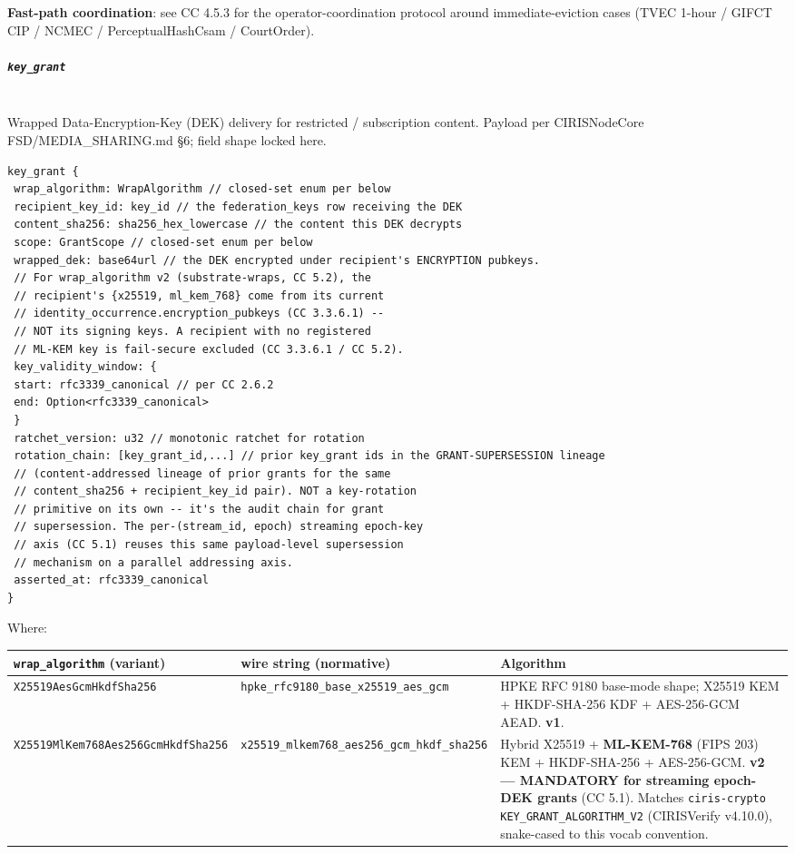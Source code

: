 \documentclass[11pt]{article}
\begin{document}
\textbf{Fast-path coordination}: see CC 4.5.3 for the operator-coordination protocol around immediate-eviction cases (TVEC 1-hour / GIFCT CIP / NCMEC / PerceptualHashCsam / CourtOrder).


\subparagraph{\texttt{key\_grant}}\mbox{}\\


Wrapped Data-Encryption-Key (DEK) delivery for restricted / subscription content. Payload per CIRISNodeCore FSD/MEDIA\_SHARING.md §6; field shape locked here.


\begin{lstlisting}
key_grant {
 wrap_algorithm: WrapAlgorithm // closed-set enum per below
 recipient_key_id: key_id // the federation_keys row receiving the DEK
 content_sha256: sha256_hex_lowercase // the content this DEK decrypts
 scope: GrantScope // closed-set enum per below
 wrapped_dek: base64url // the DEK encrypted under recipient's ENCRYPTION pubkeys.
 // For wrap_algorithm v2 (substrate-wraps, CC 5.2), the
 // recipient's {x25519, ml_kem_768} come from its current
 // identity_occurrence.encryption_pubkeys (CC 3.3.6.1) --
 // NOT its signing keys. A recipient with no registered
 // ML-KEM key is fail-secure excluded (CC 3.3.6.1 / CC 5.2).
 key_validity_window: {
 start: rfc3339_canonical // per CC 2.6.2
 end: Option<rfc3339_canonical>
 }
 ratchet_version: u32 // monotonic ratchet for rotation
 rotation_chain: [key_grant_id,...] // prior key_grant ids in the GRANT-SUPERSESSION lineage
 // (content-addressed lineage of prior grants for the same
 // content_sha256 + recipient_key_id pair). NOT a key-rotation
 // primitive on its own -- it's the audit chain for grant
 // supersession. The per-(stream_id, epoch) streaming epoch-key
 // axis (CC 5.1) reuses this same payload-level supersession
 // mechanism on a parallel addressing axis.
 asserted_at: rfc3339_canonical
}
\end{lstlisting}

Where:


{\footnotesize
\begin{longtable}{|p{5.33cm}|p{5.33cm}|p{5.33cm}|}\hline
\textbf{\texttt{wrap\_algorithm} (variant)} & \textbf{wire string (normative)} & \textbf{Algorithm} \\ \hline\endhead
\texttt{X25519AesGcmHkdfSha256} & \texttt{hpke\_rfc9180\_base\_x25519\_aes\_gcm} & HPKE RFC 9180 base-mode shape; X25519 KEM + HKDF-SHA-256 KDF + AES-256-GCM AEAD. \textbf{v1}. \\ \hline
\texttt{X25519MlKem768Aes256GcmHkdfSha256} & \texttt{x25519\_mlkem768\_aes256\_gcm\_hkdf\_sha256} & Hybrid X25519 + \textbf{ML-KEM-768} (FIPS 203) KEM + HKDF-SHA-256 + AES-256-GCM. \textbf{v2 — MANDATORY for streaming epoch-DEK grants} (CC 5.1). Matches \texttt{ciris-crypto} \texttt{KEY\_GRANT\_ALGORITHM\_V2} (CIRISVerify v4.10.0), snake-cased to this vocab convention. \\ \hline
\end{longtable}}
\end{document}
